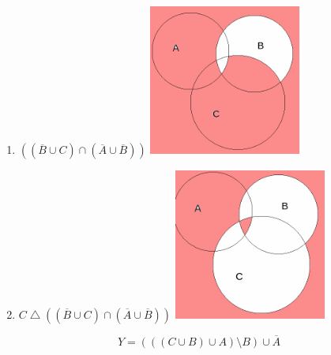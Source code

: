\documentclass{article}
\begin{document}
\begin{enumerate}
    \item $((\overline{B} \cup C) \cap (\overline{A} \cup \overline{B}))$
    \includegraphics[width=50mm]{11.png}
    
    \item $C \bigtriangleup ((\overline{B} \cup C) \cap (\overline{A} \cup \overline{B}))$
    \includegraphics[width=50mm]{12.png}
\end{enumerate}

\noindent\makebox[\linewidth]{\rule{\paperwidth}{0.4pt}}


$$Y = (((C \cup B) \cup A) \setminus B) \cup \overline{A}$$
\end{document}
